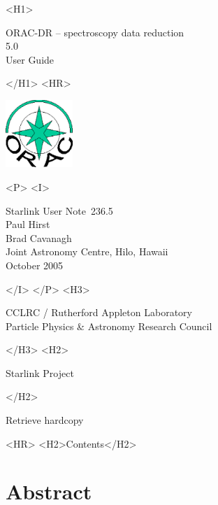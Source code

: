 \documentclass[twoside,11pt]{article}
\newcommand{\stardoccategory}  {Starlink User Note}
\newcommand{\stardocsource}    {sun\stardocnumber}
\newcommand{\stardocnumber}    {236.5}
\newcommand{\stardocauthors}   {Paul Hirst \\ Brad Cavanagh \\
                                Joint Astronomy Centre, Hilo, Hawaii}
\newcommand{\stardocdate}      {October 2005}
\newcommand{\stardoctitle}     {ORAC-DR -- spectroscopy data reduction}
\newcommand{\stardocversion}   {5.0}
\newcommand{\stardocmanual}    {User Guide}
\newcommand{\htmladdnormallink}[2]{#1}
\newcommand{\htmladdimg}[1]{}
\newcommand{\htmlref}[2]{#1}
\newcommand{\htmladdtonavigation}[1]{}
\newcommand{\xlabel}[1]{}
\renewcommand{\_}{\texttt{\symbol{95}}}
\begin{document}
\begin{htmlonly}
   \xlabel{}
   \begin{rawhtml} <H1> \end{rawhtml}
      \stardoctitle\\
      \stardocversion\\
      \stardocmanual
   \begin{rawhtml} </H1> <HR> \end{rawhtml}

\includegraphics[width=1.0in]{sun236_logo.eps}

   \begin{rawhtml} <P> <I> \end{rawhtml}
   \stardoccategory\ \stardocnumber \\
   \stardocauthors \\
   \stardocdate
   \begin{rawhtml} </I> </P> <H3> \end{rawhtml}
      \htmladdnormallink{CCLRC / Rutherford Appleton Laboratory}
                        {http://www.cclrc.ac.uk} \\
      \htmladdnormallink{Particle Physics \& Astronomy Research Council}
                        {http://www.pparc.ac.uk} \\
   \begin{rawhtml} </H3> <H2> \end{rawhtml}
      \htmladdnormallink{Starlink Project}{http://www.starlink.rl.ac.uk/}
   \begin{rawhtml} </H2> \end{rawhtml}
   \htmladdnormallink{\htmladdimg{source.gif} Retrieve hardcopy}
      {http://www.starlink.rl.ac.uk/cgi-bin/hcserver?\stardocsource}\\

  \label{stardoccontents}
  \begin{rawhtml} 
    <HR>
    <H2>Contents</H2>
  \end{rawhtml}
  \htmladdtonavigation{\htmlref{\htmladdimg{contents_motif.gif}}
        {stardoccontents}}

  \section{\xlabel{abstract}Abstract}
\end{htmlonly}
\end{document}
